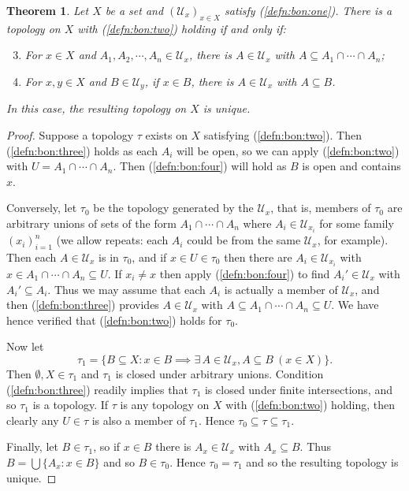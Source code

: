\documentclass[a4paper,11pt]{article}
\newcommand{\mc}[1]{{\mathcal{#1}}}
\newtheorem{theorem}[lemma]{Theorem}
\begin{document}
\begin{theorem}\label{thm:when_have_basis_nhoods}
Let $X$ be a set and $(\mc U_x)_{x\in X}$ satisfy (\ref{defn:bon:one}).
There is a topology on $X$ with (\ref{defn:bon:two}) holding if and only if:
\begin{enumerate}\setcounter{enumi}{2}
\item\label{defn:bon:three}
For $x\in X$ and $A_1,A_2,\cdots,A_n\in\mc U_x$, there is $A\in \mc U_x$ with
  $A\subseteq A_1\cap\cdots\cap A_n$;
\item\label{defn:bon:four}
For $x,y\in X$ and $B\in\mc U_y$, if $x\in B$, there is $A\in\mc U_x$ with
  $A\subseteq B$.
\end{enumerate}
In this case, the resulting topology on $X$ is unique.
\end{theorem}
\begin{proof}
Suppose a topology $\tau$ exists on $X$ satisfying (\ref{defn:bon:two}).
Then (\ref{defn:bon:three}) holds as each $A_i$ will be open, so we can
apply (\ref{defn:bon:two}) with $U=A_1\cap\cdots\cap A_n$.  Then
(\ref{defn:bon:four}) will hold as $B$ is open and contains $x$.

Conversely, let $\tau_0$ be the topology generated by the $\mc U_x$, that is,
members of $\tau_0$ are arbitrary unions of sets of the form $A_1\cap\cdots\cap
A_n$ where $A_i\in\mc U_{x_i}$ for some family $(x_i)_{i=1}^n$ (we allow
repeats: each $A_i$ could be from the same $\mc U_x$, for example).  Then each
$A\in\mc U_x$ is in $\tau_0$, and if $x\in U\in\tau_0$ then there are
$A_i\in\mc U_{x_i}$ with $x\in A_1\cap\cdots\cap A_n\subseteq U$.  If
$x_i\not=x$ then apply (\ref{defn:bon:four}) to find $A_i'\in\mc U_x$ with
$A_i'\subseteq A_i$.  Thus we may assume that each $A_i$ is actually a member of
$\mc U_x$, and then (\ref{defn:bon:three}) provides $A\in\mc U_x$ with
$A\subseteq A_1\cap\cdots\cap A_n \subseteq U$.  We have hence verified that
(\ref{defn:bon:two}) holds for $\tau_0$.

Now let
\[ \tau_1 = \big\{ B\subseteq X : x\in B \implies \exists\, A\in\mc U_x,
A\subseteq B \ (x\in X) \big\}. \]
Then $\emptyset, X\in \tau_1$ and $\tau_1$ is closed under arbitrary unions.
Condition (\ref{defn:bon:three}) readily implies that $\tau_1$ is closed under
finite intersections, and so $\tau_1$ is a topology.  If $\tau$ is any topology
on $X$ with (\ref{defn:bon:two}) holding, then clearly any $U\in\tau$ is also a
member of $\tau_1$.  Hence $\tau_0 \subseteq \tau \subseteq \tau_1$.

Finally, let $B\in\tau_1$, so if $x\in B$ there is $A_x\in\mc U_x$ with $A_x
\subseteq B$.  Thus $B = \bigcup \{ A_x : x\in B \}$ and so $B\in\tau_0$.  Hence
$\tau_0 = \tau_1$ and so the resulting topology is unique.
\end{proof}
\end{document}
